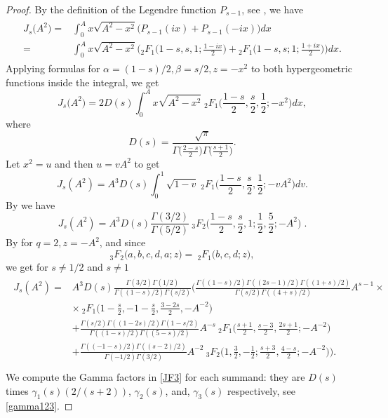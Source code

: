 \documentclass[a4paper,11pt]{amsart}
\theoremstyle{definition}
\begin{document}
\begin{proof}
By the definition of the Legendre function $P_{s-1}$, see \cite[8.704]{gradshteyn2007}, we have
\begin{align}
    \begin{split}
        J_s\big(A^2\big)=&\int_0^Ax\sqrt{A^2-x^2}\big(P_{s-1}(ix)+P_{s-1}(-ix)\big)dx \\
        =&\int_0^Ax\sqrt{A^2-x^2}\Big({}_2F_1\Big(1-s,s,1;\frac{1-ix}{2}\Big)+{}_2F_1(1-s,s;1;\frac{1+ix}{2}\Big)\Big)dx.
    \end{split}
\end{align}
Applying formulas \cite[9.136.2 and 9.136.3]{gradshteyn2007} for $\alpha=(1-s)/2,\beta=s/2,z=-x^2$ to both hypergeometric functions inside the integral, we get 
\begin{equation}\label{Js}
    J_s\big(A^2\big)=2D(s)\int_0^Ax\sqrt{A^2-x^2}\;  {}_2F_1\Big(\frac{1-s}{2},\frac{s}{2},\frac{1}{2};-x^2\Big)dx,
\end{equation}
where $$D(s)=\displaystyle \frac{\sqrt{\pi}}{\Gamma\big(\frac{2-s}{2}\big)\Gamma\big(\frac{s+1}{2}\big)}.$$
Let $x^2=u$ and then $u=vA^2$ to get
$$J_s(A^2)=A^3D(s)\int_0^1\sqrt{1-v}\;{}_2F_1\Big(\frac{1-s}{2},\frac{s}{2},\frac{1}{2};-vA^2\Big)dv.$$
By \cite[Eq. 7.512.12]{gradshteyn2007} we have 
$$J_s(A^2)=A^3D(s)\frac{\Gamma(3/2)}{\Gamma(5/2)}\:_3F_2\Big(\frac{1-s}{2},\frac{s}{2},1;\frac{1}{2},\frac{5}{2};-A^2\Big) \; .$$
By \cite[Eq. 16.8.8]{NIST} for $q=2, z=-A^2$, and since $$_3F_2\big(a,b,c,d,a;z\big)=\:_2F_1\big(b,c,d;z\big),$$ we get for $s\neq 1/2$ and $s\neq1$
\begin{align}\label{JF3}
    \begin{split}
            J_s(A^2)=&A^3D(s)\frac{\Gamma(3/2)\Gamma(1/2)}{\Gamma((1-s)/2)\Gamma(s/2)}\Bigg(\frac{\Gamma((1-s)/2)\Gamma((2s-1)/2)\Gamma((1+s)/2)}{\Gamma(s/2)\Gamma((4+s)/2)}A^{s-1}\times \\
        &\times \:_2F_1\Big(1-\frac{s}{2},-1-\frac{s}{2},\frac{3-2s}{2},-A^{-2}\Big) \\
        &+\frac{\Gamma(s/2)\Gamma((1-2s)/2)\Gamma(1-s/2)}{\Gamma((1-s)/2)\Gamma((5-s)/2)}A^{-s}\:_2F_1\Big(\frac{s+1}{2},\frac{s-3}{2},\frac{2s+1}{2};-A^{-2}\Big)\\
        &+\frac{\Gamma((-1-s)/2)\Gamma((s-2)/2)}{\Gamma(-1/2)\Gamma(3/2)}A^{-2}\:_3F_2\Big(1,\frac{3}{2},-\frac{1}{2};\frac{s+3}{2},\frac{4-s}{2};-A^{-2}\Big)\Bigg). \\
    \end{split}
\end{align}
We compute the Gamma factors in \eqref{JF3} for each summand: they are $D(s)$ times $\gamma_1(s)(2/(s+2))$, $\gamma_2(s)$, and, $\gamma_3(s)$ respectively, see \eqref{gamma123}.





\end{proof}
\end{document}
